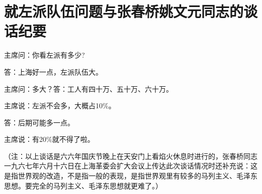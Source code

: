 \section[就左派队伍问题与张春桥姚文元同志的谈话纪要（一九六六年十月一日）]{就左派队伍问题与张春桥姚文元同志的谈话纪要}


主席问：你看左派有多少?

答：上海好一点，左派队伍大。

主席问：多大？答：工人有四十万、五十万、六十万。

主席说：左派不会多，大概占10$\%$。

答：后期可能多一点。

主席说：有20$\%$就不得了啦。

（注：以上谈话是六六年国庆节晚上在天安门上看焰火休息时进行的，张春桥同志一九六七年六月十六日在上海革委会扩大会议上传达此次谈话情况时还补充说：这是指世界观的改造，不是指一般的表现，是指世界观里有较多的马列主义、毛泽东思想。要完全的马列主义、毛泽东思想就更难了。）

